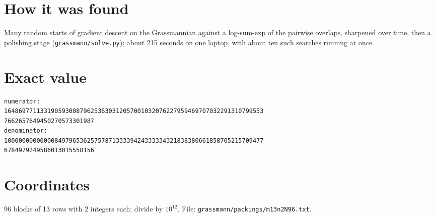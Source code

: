 \documentclass[11pt,a4paper]{article}
\begin{document}
\section{How it was found}
Many random starts of gradient descent on the Grassmannian against a log-sum-exp of the pairwise overlaps, sharpened over time, then a polishing stage (\texttt{grassmann/solve.py}); about 215 seconds on one laptop, with about ten such searches running at once.


\appendix
\section{Exact value}
{\small
\begin{verbatim}
numerator:
164869771133190593008796253630312057001032076227959469707032291310799553
7662657649450270573301987
denominator:
100000000000008497965362575787133339424333334321838380661858705215709477
6784979249586013015558156
\end{verbatim}}

\section{Coordinates}
96 blocks of 13 rows with 2 integers each; divide by $10^{12}$. File: \texttt{grassmann/packings/m13n2N96.txt}.
{\tiny
\begin{multicols}{4}
\end{multicols}}
\end{document}

